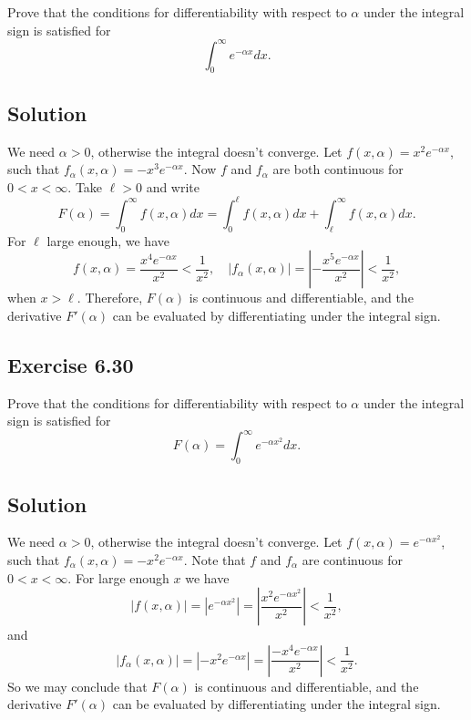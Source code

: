 Prove that the conditions for differentiability with respect to $\alpha$ under the integral sign is satisfied for
\begin{equation*}
    \int_0^{\infty} e^{-\alpha x} dx.
\end{equation*}

\subsection*{Solution}

We need $\alpha > 0$, otherwise the integral doesn't converge.
Let $f(x, \alpha) = x^{2} e^{-\alpha x}$, such that $f_{\alpha}(x, \alpha) = -x^{3} e^{-\alpha x}$.
Now $f$ and $f_{\alpha}$ are both continuous for $0 < x < \infty$.
Take $\ell > 0$ and write
\begin{equation*}
    F(\alpha) = \int_0^{\infty} f(x, \alpha) dx = \int_0^{\ell} f(x, \alpha) dx + \int_{\ell}^{\infty} f(x, \alpha) dx.
\end{equation*}
For $\ell$ large enough, we have
\begin{equation*}
    f(x, \alpha) = \frac{x^4 e^{-\alpha x}}{x^2} < \frac{1}{x^2},
    \quad \left|f_{\alpha}(x, \alpha)\right| = \left|-\frac{x^5 e^{-\alpha x}}{x^2}\right| < \frac{1}{x^2},
\end{equation*}
when $x > \ell$.
Therefore, $F(\alpha)$ is continuous and differentiable, and the derivative $F'(\alpha)$ can be evaluated by differentiating under the integral sign.


\subsection*{Exercise 6.30}

Prove that the conditions for differentiability with respect to $\alpha$ under the integral sign is satisfied for
\begin{equation*}
    F(\alpha) = \int_0^{\infty} e^{-\alpha x^2} dx.
\end{equation*}

\subsection*{Solution}

We need $\alpha > 0$, otherwise the integral doesn't converge.
Let $f(x, \alpha) = e^{-\alpha x^2}$, such that $f_{\alpha}(x, \alpha) = -x^2 e^{-\alpha x}$.
Note that $f$ and $f_{\alpha}$ are continuous for $0 < x < \infty$.
For large enough $x$ we have
\begin{equation*}
    |f(x, \alpha)| = |e^{-\alpha x^2}| = \left| \frac{x^2 e^{-\alpha x^2}}{x^2} \right| < \frac{1}{x^2},
\end{equation*}
and
\begin{equation*}
    |f_{\alpha}(x, \alpha)| = |-x^2 e^{-\alpha x}| = \left| \frac{-x^4 e^{-\alpha x}}{x^2} \right| < \frac{1}{x^2}.
\end{equation*}
So we may conclude that $F(\alpha)$ is continuous and differentiable, and the derivative $F'(\alpha)$ can be evaluated by differentiating under the integral sign.


